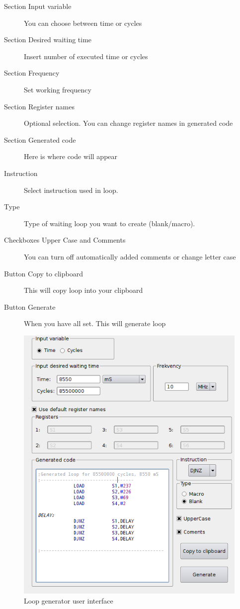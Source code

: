     \begin{description}
        \item[Section Input variable] You can choose between time or cycles
        \item[Section Desired waiting time] Insert number of executed time or cycles
        \item[Section Frequency] Set working frequency
        \item[Section Register names] Optional selection. You can change register names in generated code
        \item[Section Generated code] Here is where code will appear
        \item[Instruction] Select instruction used in loop.
        \item[Type] Type of waiting loop you want to create (blank/macro).
        \item[Checkboxes Upper Case and Comments]  You can turn off automatically added comments or change letter case
        \item[Button Copy to clipboard] This will copy loop into your clipboard
        \item[Button Generate] When you have all set. This will generate loop
    \end{description}

    \begin{figure}[h]
        \centering{}
        \includegraphics[width=.7\textwidth]{img/loop_gen.png}
        \caption{Loop generator user interface}
    \end{figure}


